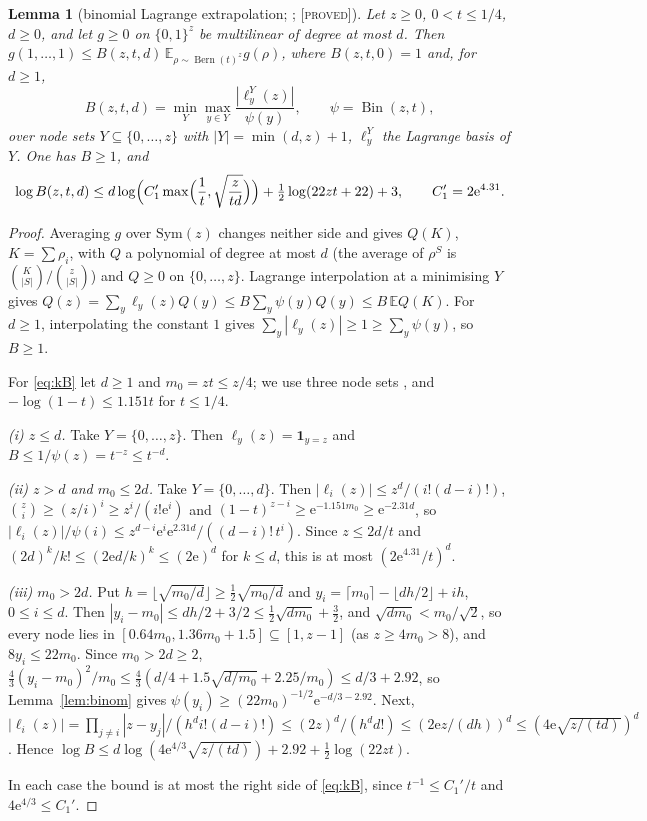 \documentclass[10pt,reqno]{amsart}
\newtheorem{lemma}[theorem]{Lemma}
\theoremstyle{definition}
\theoremstyle{remark}
\newcommand{\E}{\mathbb E}
\newcommand{\ind}{\mathbf 1}
\newcommand{\Bin}{\operatorname{Bin}}
\newcommand{\Bern}{\operatorname{Bern}}
\newcommand{\e}{\mathrm e}
\newcommand{\lab}[1]{\textup{[\textsc{#1}]}}
\begin{document}
\begin{lemma}[binomial Lagrange extrapolation; {\cite[Lemma~2.3 and \S3]{KA}}; \lab{proved}]\label{lem:kextrap}
Let $z\geq0$, $0<t\leq1/4$, $d\geq0$, and let $g\geq0$ on $\{0,1\}^z$ be
multilinear of degree at most $d$.  Then
$g(1,\dots,1)\leq B(z,t,d)\,\E_{\rho\sim\Bern(t)^z}g(\rho)$, where
$B(z,t,0)=1$ and, for $d\geq1$,
\[
 B(z,t,d)=\min_Y\max_{y\in Y}\frac{|\ell^Y_y(z)|}{\psi(y)},\qquad\psi=\Bin(z,t),
\]
over node sets $Y\subseteq\{0,\dots,z\}$ with $|Y|=\min(d,z)+1$, $\ell^Y_y$
the Lagrange basis of $Y$.  One has $B\geq1$, and
\begin{equation}\label{eq:kB}
 \log B(z,t,d)\leq d\log\Bigl(C_1'\max\Bigl(\frac1t,\sqrt{\frac z{td}}\Bigr)\Bigr)+\tfrac12\log(22zt+22)+3,
 \qquad C_1'=2\e^{4.31}.
\end{equation}
\end{lemma}
\begin{proof}
Averaging $g$ over $\mathrm{Sym}(z)$ changes neither side and gives $Q(K)$,
$K=\sum\rho_i$, with $Q$ a polynomial of degree at most $d$ (the average of
$\rho^S$ is $\binom K{|S|}/\binom z{|S|}$) and $Q\geq0$ on $\{0,\dots,z\}$.
Lagrange interpolation at a minimising $Y$ gives
$Q(z)=\sum_y\ell_y(z)Q(y)\leq B\sum_y\psi(y)Q(y)\leq B\,\E Q(K)$.  For
$d\geq1$, interpolating the constant $1$ gives
$\sum_y|\ell_y(z)|\geq1\geq\sum_y\psi(y)$, so $B\geq1$.

For \eqref{eq:kB} let $d\geq1$ and $m_0=zt\leq z/4$; we use three node sets
\cite[\S3]{KA}, and $-\log(1-t)\leq1.151t$ for $t\leq1/4$.

\emph{(i) $z\leq d$.}  Take $Y=\{0,\dots,z\}$.  Then $\ell_y(z)=\ind_{y=z}$ and
$B\leq1/\psi(z)=t^{-z}\leq t^{-d}$.

\emph{(ii) $z>d$ and $m_0\leq2d$.}  Take $Y=\{0,\dots,d\}$.  Then
$|\ell_i(z)|\leq z^d/(i!(d-i)!)$, $\binom zi\geq(z/i)^i\geq z^i/(i!\e^i)$ and
$(1-t)^{z-i}\geq\e^{-1.151m_0}\geq\e^{-2.31d}$, so
$|\ell_i(z)|/\psi(i)\leq z^{d-i}\e^i\e^{2.31d}/((d-i)!\,t^i)$.  Since
$z\leq2d/t$ and $(2d)^k/k!\leq(2\e d/k)^k\leq(2\e)^d$ for $k\leq d$, this is at
most $(2\e^{4.31}/t)^d$.

\emph{(iii) $m_0>2d$.}  Put $h=\lfloor\sqrt{m_0/d}\rfloor\geq\frac12\sqrt{m_0/d}$ and
$y_i=\lceil m_0\rceil-\lfloor dh/2\rfloor+ih$, $0\leq i\leq d$.  Then
$|y_i-m_0|\leq dh/2+3/2\leq\frac12\sqrt{dm_0}+\frac32$, and
$\sqrt{dm_0}<m_0/\sqrt2$, so every node lies in
$[0.64m_0,1.36m_0+1.5]\subseteq[1,z-1]$ (as $z\geq4m_0>8$), and $8y_i\leq22m_0$.
Since $m_0>2d\geq2$,
$\frac43(y_i-m_0)^2/m_0\leq\frac43(d/4+1.5\sqrt{d/m_0}+2.25/m_0)\leq d/3+2.92$,
so Lemma~\ref{lem:binom} gives $\psi(y_i)\geq(22m_0)^{-1/2}\e^{-d/3-2.92}$.  Next,
$|\ell_i(z)|=\prod_{j\neq i}|z-y_j|/(h^di!(d-i)!)\leq(2z)^d/(h^dd!)\leq(2\e z/(dh))^d
\leq(4\e\sqrt{z/(td)})^d$.  Hence
$\log B\leq d\log(4\e^{4/3}\sqrt{z/(td)})+2.92+\frac12\log(22zt)$.

In each case the bound is at most the right side of \eqref{eq:kB}, since
$t^{-1}\leq C_1'/t$ and $4\e^{4/3}\leq C_1'$.
\end{proof}
\end{document}
